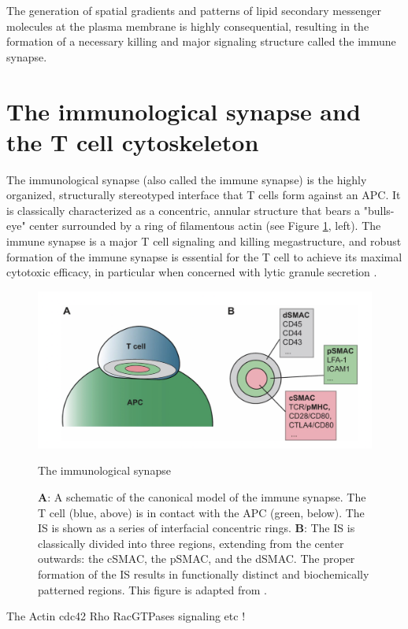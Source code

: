 The generation of spatial gradients and patterns of lipid secondary messenger molecules at the plasma membrane is highly consequential, resulting in the formation of a necessary killing and major signaling structure called the immune synapse. 

\section{The immunological synapse and the T cell cytoskeleton}
The immunological synapse (also called the immune synapse) is the highly organized, structurally stereotyped interface that T cells form against an APC. It is classically characterized as a concentric, annular structure that bears a "bulls-eye" center surrounded by a ring of filamentous actin (see Figure \ref{fig:immunesynapse}, left). The immune synapse is a major T cell signaling and killing megastructure, and robust formation of the immune synapse is essential for the T cell to achieve its maximal cytotoxic efficacy, in particular when concerned with lytic granule secretion \cite{Ritter2015}.

\begin{figure}[htbp]
	\centering
	\includegraphics[width=\textwidth]{../figures/chapter1/immunesynapse.png}
	\caption{The immunological synapse}
	\caption*{\textbf{A}: A schematic of the canonical model of the immune synapse. The T cell (blue, above) is in contact with the APC (green, below). The IS is shown as a series of interfacial concentric rings.  \textbf{B}: The IS is classically divided into three regions, extending from the center outwards: the cSMAC, the pSMAC, and the dSMAC.  The proper formation of the IS results in functionally distinct and biochemically patterned regions.  This figure is adapted from \cite{Yu2013}.}
	\label{fig:immunesynapse}
\end{figure}

The 
Actin cdc42 Rho RacGTPases signaling etc !

